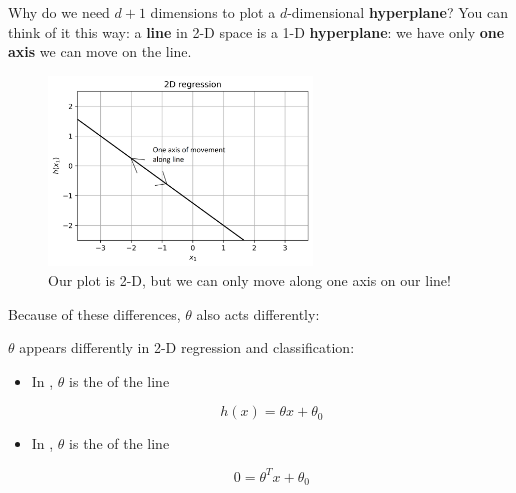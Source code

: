        Why do we need $d+1$ dimensions to plot a $d$-dimensional \textbf{hyperplane}? You can think of it this way: a \textbf{line} in 2-D space is a 1-D \textbf{hyperplane}: we have only \textbf{one axis} we can move on the line.
            
        \begin{figure}[H]
            \centering
            
            \includegraphics[width=70mm,scale=0.5]{images/classification_images/2d_regression_1d_hyperplane.png}
            \caption*{Our plot is 2-D, but we can only move along one axis on our line!}
        \end{figure}    
        
        Because of these differences, $\theta$ also acts differently:\\
        
        \begin{clarification}
            $\theta$ appears differently in 2-D regression and classification:
            
            \begin{itemize}
                \item In , $\theta$ is the  of the line
                
                    \begin{equation}
                        h(x) = \theta x + \theta_0
                    \end{equation}
                
                \item In , $\theta$ is the  of the line
                
                    \begin{equation}
                        0 = \theta^T x + \theta_0
                    \end{equation}
                
            \end{itemize}
        \end{clarification}
        
